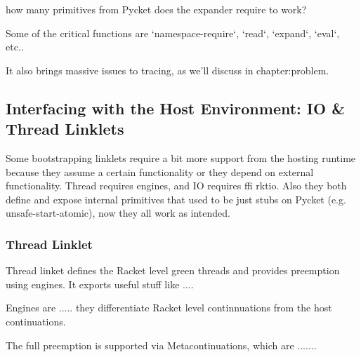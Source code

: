 			\begin{todo}
				how many primitives from Pycket does the expander require to work?
			\end{todo}

			\begin{paragraph-here}%
				Some of the critical functions are `namespace-require`, `read`, `expand`, `eval`, etc..
			\end{paragraph-here}

			\begin{paragraph-here}%
				It also brings massive issues to tracing, as we'll discuss in chapter:problem.
			\end{paragraph-here}

		\subsection{Interfacing with the Host Environment: IO \& Thread Linklets}

			\begin{paragraph-here}%
				Some bootstrapping linklets require a bit more support from the hosting runtime because they assume a certain functionality or they depend on external functionality. Thread requires engines, and IO requires ffi rktio. Also they both define and expose internal primitives that used to be just stubs on Pycket (e.g. unsafe-start-atomic), now they all work as intended.
			\end{paragraph-here}

			\subsubsection{Thread Linklet}

				\begin{paragraph-here}%
					Thread linket defines the Racket level green threads and provides preemption using engines. It exports useful stuff like ....
				\end{paragraph-here}

				\begin{paragraph-here}%
					Engines are ..... they differentiate Racket level continnuations from the host continuations.
				\end{paragraph-here}

				\begin{paragraph-here}%
					The full preemption is supported via Metacontinuations, which are .......
				\end{paragraph-here}

